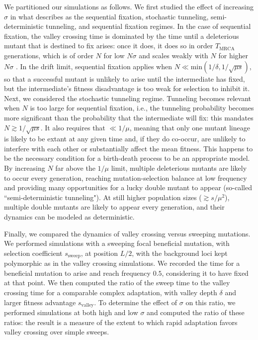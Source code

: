 \documentclass[rmp]{revtex4}
\begin{document}
\begin{spacing}{1.5}
We partitioned our simulations as follows.
We first studied the effect of increasing $\sigma$ in what \citet{weissman_2009} describes as the sequential fixation, stochastic tunneling, semi-deterministic tunneling, and sequential fixation regimes.
In the case of sequential fixation, the valley crossing time is dominated by the time until a deleterious mutant that is destined to fix arises: once it does, it does so in order $T_{\mathrm{MRCA}}$ generations, which is of order $N$ for low $N\sigma$ and scales weakly with $N$ for higher $N\sigma$ \citep{neher_hallatschek_2013}.
In the drift limit, sequential fixation applies when $N \ll \mathrm{min}(1/\delta, 1/\sqrt{\mu s})$, so that a successful mutant is unlikely to arise until the intermediate has fixed, but the intermediate's fitness disadvantage is too weak for selection to inhibit it.
Next, we considered the stochastic tunneling regime.
Tunneling becomes relevant when $N$ is too large for sequential fixation, i.e., the tunneling probability becomes more significant than the probability that the intermediate will fix: this mandates $N \gtrsim 1/\sqrt{\mu s}$.
It also requires that $\ll 1/\mu$, meaning that only one mutant lineage is likely to be extant at any given time and, if they do co-occur, are unlikely to interfere with each other or substantially affect the mean fitness.
This happens to be the necessary condition for a birth-death process to be an appropriate model.
By increasing $N$ far above the $1/\mu$ limit, multiple deleterious mutants are likely to occur every generation, reaching mutation-selection balance at low frequency and providing many opportunities for a lucky double mutant to appear (so-called ``semi-deterministic tunneling").
At still higher population sizes ($\gtrsim s/\mu^2$), multiple double mutants are likely to appear every generation, and their dynamics can be modeled as deterministic.

Finally, we compared the dynamics of valley crossing versus sweeping mutations.
We performed simulations with a sweeping focal beneficial mutation, with selection coefficient $s_{\mathrm{sweep}}$, at position $L/2$, with the background loci kept polymorphic as in the valley crossing simulations.
We recorded the time for a beneficial mutation to arise and reach frequency $0.5$, considering it to have fixed at that point.
We then computed the ratio of the sweep time to the valley crossing time for a comparable complex adaptation, with valley depth $\delta$ and larger fitness advantage $s_{\mathrm{valley}}$.
To determine the effect of $\sigma$ on this ratio, we performed simulations at both high and low $\sigma$ and computed the ratio of these ratios: the result is a measure of the extent to which rapid adaptation favors valley crossing over simple sweeps.


\end{spacing}
\end{document}
